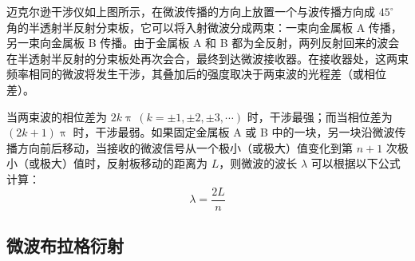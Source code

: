 \documentclass[UTF-8,twoside,cs4size]{ctexart}
\begin{document}
迈克尔逊干涉仪如上图所示，在微波传播的方向上放置一个与波传播方向成 $45^{\circ}$ 角的半透射半反射分束板，它可以将入射微波分成两束：一束向金属板 A 传播，另一束向金属板 B 传播。由于金属板 A 和 B 都为全反射，两列反射回来的波会在半透射半反射的分束板处再次会合，最终到达微波接收器。在接收器处，这两束频率相同的微波将发生干涉，其叠加后的强度取决于两束波的光程差（或相位差）。

当两束波的相位差为 $2k\uppi \, (k = \pm 1, \pm 2, \pm 3, \cdots)$ 时，干涉最强；而当相位差为 $(2k+1)\uppi$ 时，干涉最弱。如果固定金属板 A 或 B 中的一块，另一块沿微波传播方向前后移动，当接收的微波信号从一个极小（或极大）值变化到第 $n+1$ 次极小（或极大）值时，反射板移动的距离为 $L$，则微波的波长 $\lambda$ 可以根据以下公式计算：
\[
\lambda = \frac{2L}{n}
\]

\subsection{微波布拉格衍射}
\end{document}
